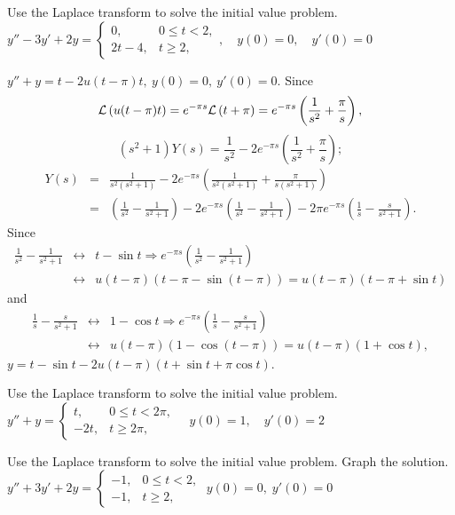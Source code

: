 \documentclass{ximera}
\begin{document}
\begin{problem}\label{exer:8.5.11} Use the Laplace transform to solve the initial value problem.
$y''-3y'+2y=\left\{\begin{array}{cl} 0,&0\le
t<2,\\2t-4,&t\ge 2,\end{array}\right. ,\quad y(0)=0,\quad y'(0)=0$

\begin{solution}
$y''+y=t-2u(t-\pi)t,\ y(0)=0,\ y'(0)=0$.
Since
$$
{\cal L}\left(u(t-\pi)t\right)=e^{-\pi s}{\cal L}\left(t+\pi\right)
=e^{-\pi s}\left(\frac{1}{s^2}+\frac{\pi}{s}\right),
$$
$$
(s^2+1)Y(s)=\frac{1}{s^2}-2e^{-\pi s}\left(\frac{1}{s^2}+\frac{\pi}{s}\right);
$$
\begin{eqnarray*}
Y(s)&=& \frac{1}{s^2(s^2+1)}-2e^{-\pi s}\left(\frac{1}{s^2(s^2+1)}+\frac{\pi}{s(s^2+1)}\right)\\ &=&\left(\frac{1}{s^2}-\frac{1}{s^2+1}\right)-2e^{-\pi s} \left(\frac{1}{s^2}-\frac{1}{s^2+1}\right)-2\pi e^{-\pi s}\left(\frac{1}{s}-\frac{s}{s^2+1}\right).
\end{eqnarray*}
Since
\begin{eqnarray*}
\frac{1}{s^2}-\frac{1}{s^2+1}&\leftrightarrow& t-\sin t\Rightarrow
e^{-\pi s}\left(\frac{1}{s^2}-\frac{1}{s^2+1}\right)\\ &\leftrightarrow&
u(t-\pi)\left(t-\pi-\sin(t-\pi)\right)=u(t-\pi)(t-\pi+\sin t)
\end{eqnarray*}
and
\begin{eqnarray*}
\frac{1}{s}-\frac{s}{s^2+1}&\leftrightarrow& 1-\cos t\Rightarrow
e^{-\pi s}\left(\frac{1}{s}-\frac{s}{s^2+1}\right)\\ &\leftrightarrow&
u(t-\pi)\left(1-\cos(t-\pi)\right)=u(t-\pi)(1+\cos t),
\end{eqnarray*}
 $y=t-\sin t-2u(t-\pi)(t+\sin t+\pi\cos t)$.
\end{solution}
\end{problem}

\begin{problem}\label{exer:8.5.12} Use the Laplace transform to solve the initial value problem.
$y''+y=\left\{\begin{array}{cl} t,&0\le
t<2\pi,\\-2t,&t\ge 2\pi,\end{array}\right.\quad y(0)=1,\quad y'(0)=2$
\end{problem}

\begin{problem}\label{exer:8.5.13} Use the Laplace transform to solve the initial value problem.  Graph the solution.
$y''+3y'+2y=\left\{\begin{array}{cl}-1,&0\le
t<2,\\-1,&t\ge 2,\end{array}\right.\;  y(0)=0,\;  y'(0)=0$
\end{problem}
\end{document}
